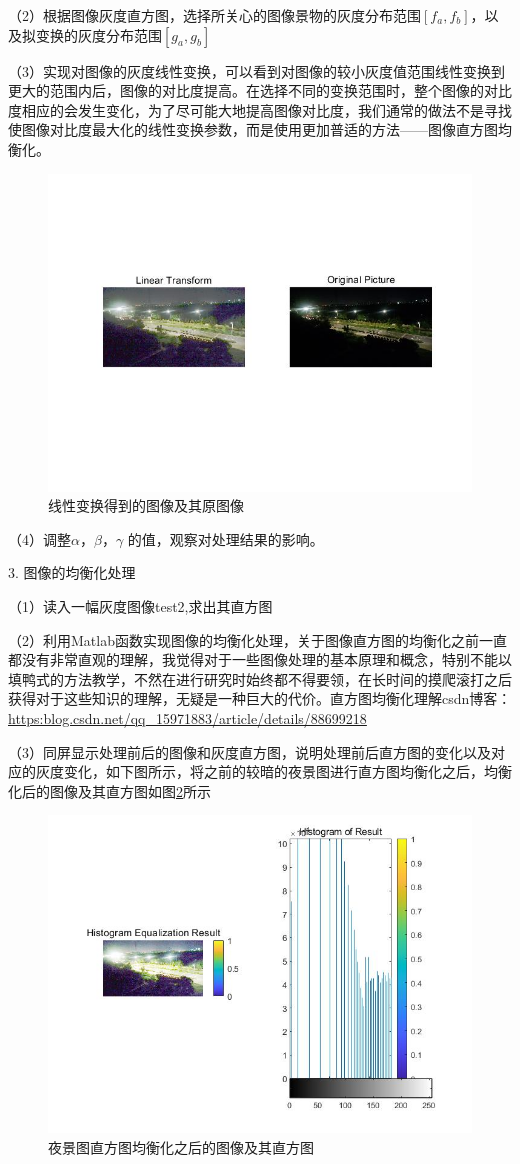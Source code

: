 \documentclass[UTF8]{article} %
\begin{document}
	（2）根据图像灰度直方图，选择所关心的图像景物的灰度分布范围$[f_{a},f_{b}]$，以及拟变换的灰度分布范围$[g_{a},g_{b}]$
	
	（3）实现对图像的灰度线性变换，可以看到对图像的较小灰度值范围线性变换到更大的范围内后，图像的对比度提高。在选择不同的变换范围时，整个图像的对比度相应的会发生变化，为了尽可能大地提高图像对比度，我们通常的做法不是寻找使图像对比度最大化的线性变换参数，而是使用更加普适的方法——图像直方图均衡化。
	\begin{figure}[H]
		\centering
		\includegraphics[width=0.7\linewidth]{1-1}
		\caption{线性变换得到的图像及其原图像}
		\label{fig:1-1}
	\end{figure}
	
	（4）调整$\alpha$，$\beta$，$\gamma$ 的值，观察对处理结果的影响。
	
	3. 图像的均衡化处理
	
	（1）读入一幅灰度图像test2,求出其直方图
	
	（2）利用Matlab函数实现图像的均衡化处理，关于图像直方图的均衡化之前一直都没有非常直观的理解，我觉得对于一些图像处理的基本原理和概念，特别不能以填鸭式的方法教学，不然在进行研究时始终都不得要领，在长时间的摸爬滚打之后获得对于这些知识的理解，无疑是一种巨大的代价。直方图均衡化理解csdn博客：\url{https:blog.csdn.net/qq_15971883/article/details/88699218}
	
	（3）同屏显示处理前后的图像和灰度直方图，说明处理前后直方图的变化以及对应的灰度变化，如下图所示，将之前的较暗的夜景图进行直方图均衡化之后，均衡化后的图像及其直方图如图\ref{fig:1-2}所示
	\begin{figure}[H]
		\centering
		\includegraphics[width=0.5\linewidth]{1-2}
		\caption{夜景图直方图均衡化之后的图像及其直方图}
		\label{fig:1-2}
	\end{figure}
\end{document}

